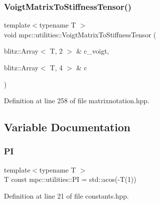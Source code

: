 \subsubsection{\texorpdfstring{Voigt\+Matrix\+To\+Stiffness\+Tensor()}{VoigtMatrixToStiffnessTensor()}}
{\footnotesize\ttfamily template$<$typename T $>$ \\
void mpc\+::utilities\+::\+Voigt\+Matrix\+To\+Stiffness\+Tensor (\begin{DoxyParamCaption}\item[{blitz\+::\+Array$<$ T, 2 $>$ \&}]{c\+\_\+voigt,  }\item[{blitz\+::\+Array$<$ T, 4 $>$ \&}]{c }\end{DoxyParamCaption})}



Definition at line 258 of file matrixnotation.\+hpp.



\subsection{Variable Documentation}
\mbox{\label{namespacempc_1_1utilities_a9ebe3319659192350da76891a61820d0}} 
\subsubsection{\texorpdfstring{PI}{PI}}
{\footnotesize\ttfamily template$<$typename T $>$ \\
T const mpc\+::utilities\+::\+PI = std\+::acos(-\/T(1))}



Definition at line 21 of file constants.\+hpp.

